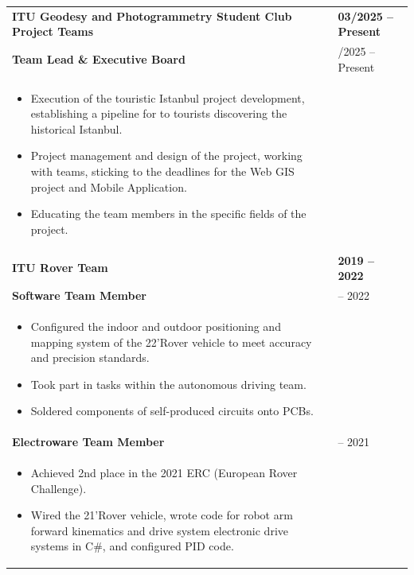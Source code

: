 \documentclass[10pt,a4paper]{article}
\begin{document}
\begin{longtable}{@{} p{} | >{\centering\arraybackslash}p{} @{}}
  \vspace{-2pt}
  \textbf{ITU Geodesy and Photogrammetry Student Club Project Teams} & \textbf{03/2025 -- Present} \\
  \quad \textbf{\color{cvblue}Team Lead \& Executive Board} & 03/2025 -- Present \\ [-5pt]
  \begin{itemize}
    \item Execution of the touristic Istanbul project development, establishing a pipeline for to tourists discovering the historical Istanbul.
    \item Project management and design of the project, working with teams, sticking to the deadlines for the Web GIS project and Mobile Application.
    \item Educating the team members in the specific fields of the project.
  \end{itemize} & \\ [10pt]

  \vspace{-2pt}
  \textbf{ITU Rover Team} & \textbf{2019 -- 2022} \\
  \quad \textbf{\color{cvblue}Software Team Member} & 2021 -- 2022 \\ [-5pt]
  \begin{itemize}
    \item Configured the indoor and outdoor positioning and mapping system of the 22'Rover vehicle to meet accuracy and precision standards.
    \item Took part in tasks within the autonomous driving team.
    \item Soldered components of self-produced circuits onto PCBs.
  \end{itemize} & \\ [10pt]

  \vspace{-5pt}
  \quad \textbf{\color{cvblue}Electroware Team Member} & 2020 -- 2021 \\ [-5pt]
  \begin{itemize}
    \item Achieved 2nd place in the 2021 ERC (European Rover Challenge).
    \item Wired the 21'Rover vehicle, wrote code for robot arm forward kinematics and drive system electronic drive systems in C\#, and configured PID code.
  \end{itemize} & \\ [10pt]


\end{longtable}
\end{document}
